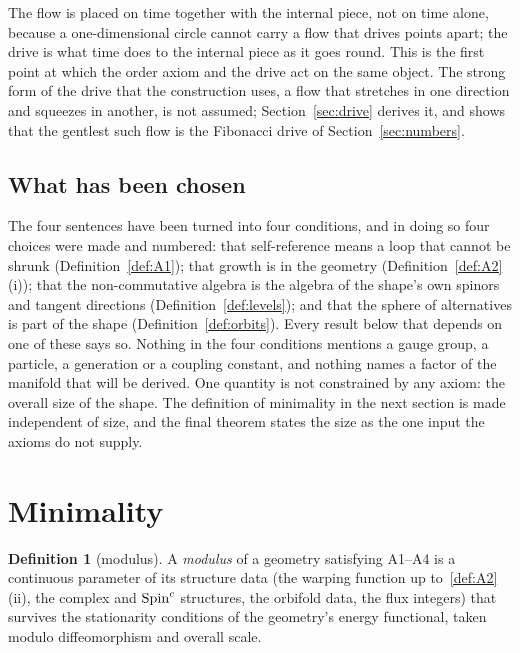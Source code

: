 \documentclass[11pt,a4paper]{article}
\theoremstyle{plain}
\theoremstyle{definition}
\newtheorem{definition}[theorem]{Definition}
\theoremstyle{remark}
\begin{document}
The flow is placed on time together with the internal piece, not on time alone, because a one-dimensional circle cannot carry a flow that drives points apart; the drive is what time does to the internal piece as it goes round. This is the first point at which the order axiom and the drive act on the same object. The strong form of the drive that the construction uses, a flow that stretches in one direction and squeezes in another, is not assumed; Section~\ref{sec:drive} derives it, and shows that the gentlest such flow is the Fibonacci drive of Section~\ref{sec:numbers}.

\subsection{What has been chosen}\label{sec:scope}

The four sentences have been turned into four conditions, and in doing so four choices were made and numbered: that self-reference means a loop that cannot be shrunk (Definition~\ref{def:A1}); that growth is in the geometry (Definition~\ref{def:A2}(i)); that the non-commutative algebra is the algebra of the shape's own spinors and tangent directions (Definition~\ref{def:levels}); and that the sphere of alternatives is part of the shape (Definition~\ref{def:orbits}). Every result below that depends on one of these says so. Nothing in the four conditions mentions a gauge group, a particle, a generation or a coupling constant, and nothing names a factor of the manifold that will be derived. One quantity is not constrained by any axiom: the overall size of the shape. The definition of minimality in the next section is made independent of size, and the final theorem states the size as the one input the axioms do not supply.

\section{Minimality}\label{sec:minimal}

\begin{definition}[modulus]\label{def:modulus}
A \emph{modulus} of a geometry satisfying A1--A4 is a continuous parameter of its structure data (the warping function up to~\eqref{def:A2}(ii), the complex and $\text{Spin}^c$ structures, the orbifold data, the flux integers) that survives the stationarity conditions of the geometry's energy functional, taken modulo diffeomorphism and overall scale.
\end{definition}
\end{document}
